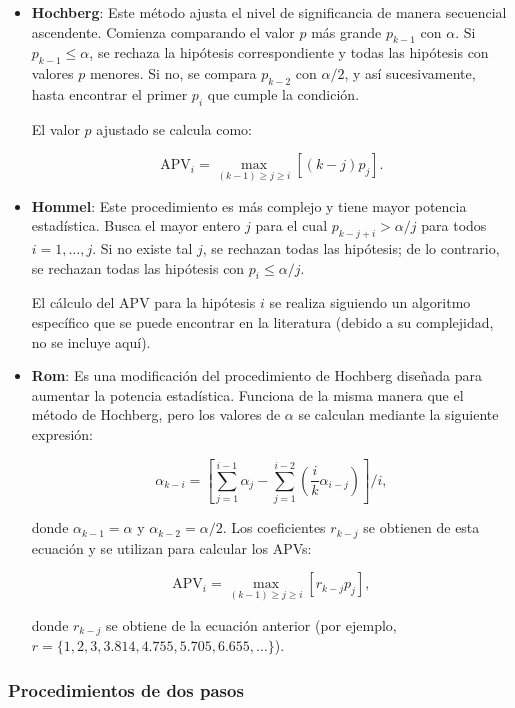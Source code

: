 \begin{itemize}
    \item \textbf{Hochberg}: Este método ajusta el nivel de significancia de manera secuencial ascendente. Comienza comparando el valor $p$ más grande $p_{k-1}$ con $\alpha$. Si $p_{k-1} \leq \alpha$, se rechaza la hipótesis correspondiente y todas las hipótesis con valores $p$ menores. Si no, se compara $p_{k-2}$ con $\alpha / 2$, y así sucesivamente, hasta encontrar el primer $p_i$ que cumple la condición.

    El valor $p$ ajustado se calcula como:

    \[
    \text{APV}_i = \max_{(k - 1) \geq j \geq i} \left[(k - j) p_j\right].
    \]

    \item \textbf{Hommel}: Este procedimiento es más complejo y tiene mayor potencia estadística. Busca el mayor entero $j$ para el cual $p_{k - j + i} > \alpha / j$ para todos $i = 1, \dots, j$. Si no existe tal $j$, se rechazan todas las hipótesis; de lo contrario, se rechazan todas las hipótesis con $p_i \leq \alpha / j$.

    El cálculo del APV para la hipótesis $i$ se realiza siguiendo un algoritmo específico que se puede encontrar en la literatura (debido a su complejidad, no se incluye aquí).

    \item \textbf{Rom}: Es una modificación del procedimiento de Hochberg diseñada para aumentar la potencia estadística. Funciona de la misma manera que el método de Hochberg, pero los valores de $\alpha$ se calculan mediante la siguiente expresión:

    \[
    \alpha_{k - i} = \left[\sum_{j = 1}^{i - 1} \alpha_j - \sum_{j = 1}^{i - 2} \left( \frac{i}{k} \alpha_{i - j} \right)\right] / i,
    \]

    donde $\alpha_{k - 1} = \alpha$ y $\alpha_{k - 2} = \alpha / 2$. Los coeficientes $r_{k - j}$ se obtienen de esta ecuación y se utilizan para calcular los APVs:

    \[
    \text{APV}_i = \max_{(k - 1) \geq j \geq i} [r_{k - j} p_j],
    \]

    donde $r_{k - j}$ se obtiene de la ecuación anterior (por ejemplo, $r = \{1, 2, 3, 3.814, 4.755, 5.705, 6.655, \dots\}$).
\end{itemize}

\subsubsection{Procedimientos de dos pasos}

